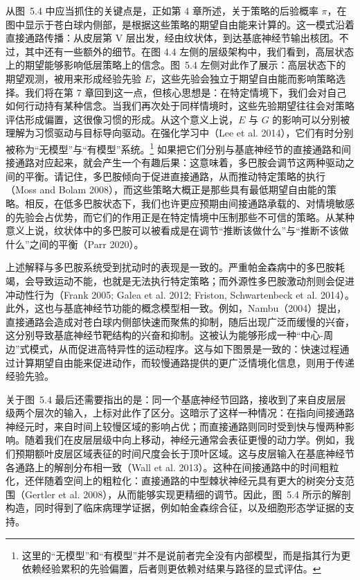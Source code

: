 从图~5.4 中应当抓住的关键点是，正如第 4 章所述，关于策略的后验概率 $\pi$，在图中显示于苍白球内侧部，是根据这些策略的期望自由能来计算的。这一模式沿着直接通路传播：从皮层第 V 层出发，经由纹状体，到达基底神经节输出核团。不过，其中还有一些额外的细节。在图 4.4 左侧的层级架构中，我们看到，高层状态上的期望能够影响低层策略上的信念。图~5.4 左侧对此作了展示：高层状态下的期望观测，被用来形成经验先验 $E$，这些先验会独立于期望自由能而影响策略选择。我们将在第 7 章回到这一点，但核心思想是：在特定情境下，我们会对自己如何行动持有某种信念。当我们再次处于同样情境时，这些先验期望往往会对策略评估形成偏置，这很像习惯的形成。从这个意义上说，$E$ 与 $G$ 的影响可以分别被理解为习惯驱动与目标导向驱动。在强化学习中（Lee et al. 2014），它们有时分别被称为“无模型”与“有模型”系统。\footnote{这里的“无模型”和“有模型”并不是说前者完全没有内部模型，而是指其行为更依赖经验累积的先验偏置，后者则更依赖对结果与路径的显式评估。} 如果把它们分别与基底神经节的直接通路和间接通路对应起来，就会产生一个有趣后果：这意味着，多巴胺会调节这两种驱动之间的平衡。请记住，多巴胺倾向于促进直接通路，从而推动特定策略的执行（Moss and Bolam 2008），而这些策略大概正是那些具有最低期望自由能的策略。相反，在低多巴胺状态下，我们也许更应预期由间接通路承载的、对情境敏感的先验会占优势，而它们的作用正是在特定情境中压制那些不可信的策略。从某种意义上说，纹状体中的多巴胺可以被看成是在调节“推断该做什么”与“推断不该做什么”之间的平衡（Parr 2020）。

上述解释与多巴胺系统受到扰动时的表现是一致的。严重帕金森病中的多巴胺耗竭，会导致运动不能，也就是无法执行特定策略；而外源性多巴胺激动剂则会促进冲动性行为（Frank 2005; Galea et al. 2012; Friston, Schwartenbeck et al. 2014）。此外，这也与基底神经节功能的概念模型相一致。例如，Nambu（2004）提出，直接通路会造成对苍白球内侧部快速而聚焦的抑制，随后出现广泛而缓慢的兴奋，这分别导致基底神经节靶结构的兴奋和抑制。这被认为能够形成一种“中心-周边”式模式，从而促进高特异性的运动程序。这与如下图景是一致的：快速过程通过计算期望自由能来促进动作，而较慢通路提供的更广泛情境化信息，则用于传递经验先验。

关于图~5.4 最后还需要指出的是：同一个基底神经节回路，接收到了来自皮层层级两个层次的输入，上标对此作了区分。这暗示了这样一种情况：在指向间接通路神经元时，来自时间上较慢区域的影响占优；而直接通路则同时受到快与慢两种影响。随着我们在皮层层级中向上移动，神经元通常会表征更慢的动力学。例如，我们预期额叶皮层区域表征的时间尺度会长于顶叶区域。这与皮层输入在基底神经节各通路上的解剖分布相一致（Wall et al. 2013）。这种在间接通路中的时间粗粒化，还伴随着空间上的粗粒化：直接通路的中型棘状神经元具有更大的树突分支范围（Gertler et al. 2008），从而能够实现更精细的调节。因此，图~5.4 所示的解剖构造，同时得到了临床病理学证据，例如帕金森综合征，以及细胞形态学证据的支持。

